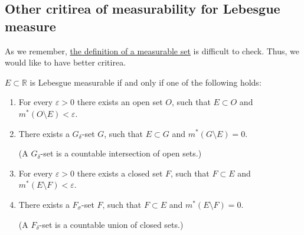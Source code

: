 \pagebreak
\subsection{Other critirea of measurability for Lebesgue measure}
As we remember, \hyperref[def:measurable]{the definition
of a measurable set} is difficult to check. Thus, we would like to have
better critirea.
\begin{theorem}
    $E \subset \mathbb{R}$ is Lebesgue measurable if and only if one of the following holds:
    \begin{enumerate}
        \item {
            For every $\varepsilon > 0$ there exists an open set $O$, such that
            $E \subset O$ and $m^*(O \setminus E) < \varepsilon$.
        }
        \item {
            There exists a $G_\delta$-set $G$, such that $E \subset G$ 
            and $m^*(G \setminus E) = 0$.

            (A $G_\delta$-set is a countable intersection of open sets.)
        }
        \item {
            For every $\varepsilon > 0$ there exists a closed set $F$, such that
            $F \subset E$ and $m^*(E \setminus F) < \varepsilon$.
        }
        \item {
            There exists a $F_\sigma$-set $F$, such that $F \subset E$
            and $m^*(E \setminus F) = 0$.

            (A $F_\delta$-set is a countable union of closed sets.)
        }
    \end{enumerate}
\end{theorem}
